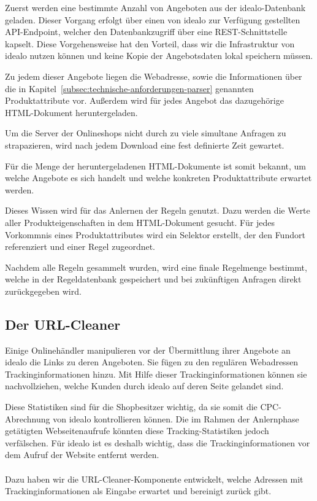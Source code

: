Zuerst werden eine bestimmte Anzahl von Angeboten aus der idealo-Datenbank geladen.
Dieser Vorgang erfolgt über einen von idealo zur Verfügung gestellten API-Endpoint, welcher den Datenbankzugriff über
eine REST-Schnittstelle kapselt.
Diese Vorgehensweise hat den Vorteil, dass wir die Infrastruktur von idealo nutzen können und keine Kopie der
Angebotsdaten lokal speichern müssen.

Zu jedem dieser Angebote liegen die Webadresse, sowie die Informationen über die in
Kapitel~\ref{subsec:technische-anforderungen-parser} genannten Produktattribute vor.
Außerdem wird für jedes Angebot das dazugehörige HTML-Dokument heruntergeladen.

Um die Server der Onlineshops nicht durch zu viele simultane Anfragen zu strapazieren, wird nach jedem
Download eine fest definierte Zeit gewartet.

Für die Menge der heruntergeladenen HTML-Dokumente ist somit bekannt, um welche Angebote es sich handelt und welche
konkreten Produktattribute erwartet werden.

Dieses Wissen wird für das Anlernen der Regeln genutzt.
Dazu werden die Werte aller Produkteigenschaften in dem HTML-Dokument gesucht.
Für jedes Vorkommnis eines Produktattributes wird ein Selektor erstellt, der den Fundort referenziert und einer Regel
zugeordnet.

Nachdem alle Regeln gesammelt wurden, wird eine finale Regelmenge bestimmt, welche in der Regeldatenbank gespeichert
und bei zukünftigen Anfragen direkt zurückgegeben wird.

\subsection{Der URL-Cleaner}
\label{subsec:urlcleaner}

Einige Onlinehändler manipulieren vor der Übermittlung ihrer Angebote an idealo die Links zu deren Angeboten.
Sie fügen zu den regulären Webadressen Trackinginformationen hinzu.
Mit Hilfe dieser Trackinginformationen können sie nachvollziehen, welche Kunden durch idealo auf deren Seite gelandet
sind.

Diese Statistiken sind für die Shopbesitzer wichtig, da sie somit die CPC-Abrechnung von idealo kontrollieren
können.
Die im Rahmen der Anlernphase getätigten Webseitenaufrufe könnten diese Tracking-Statistiken jedoch verfälschen.
Für idealo ist es deshalb wichtig, dass die Trackinginformationen vor dem Aufruf der Website entfernt werden.
\\
~\\
Dazu haben wir die URL-Cleaner-Komponente entwickelt, welche Adressen mit Trackinginformationen als Eingabe erwartet und
bereinigt zurück gibt.

